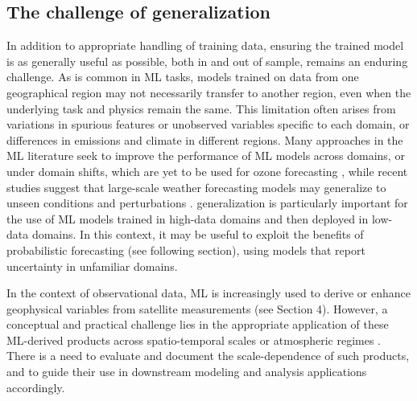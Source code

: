 \documentclass[gmd, manuscript]{copernicus}
\begin{document}

\subsection{The challenge of generalization}

In addition to appropriate handling of training data, ensuring the trained model is as generally useful as possible, both in and out of sample, remains an enduring challenge. As is common in ML tasks, models trained on data from one geographical region may not necessarily transfer to another region, even when the underlying task and physics remain the same. This limitation often arises from variations in spurious features or unobserved variables specific to each domain, or differences in emissions and climate in different regions. Many approaches in the ML literature seek to improve the performance of ML models across domains, or under domain shifts, which are yet to be used for ozone forecasting \citep{Sagawa2019}, while recent studies suggest that large-scale weather forecasting models may generalize to unseen conditions and perturbations \citep{Hakim2024}. generalization is particularly important for the use of ML models trained in high-data domains and then deployed in low-data domains. In this context, it may be useful to exploit the benefits of probabilistic forecasting (see following section), using models that report uncertainty in unfamiliar domains.

In the context of observational data, ML is increasingly used to derive or enhance geophysical variables from satellite measurements (see Section 4). However, a conceptual and practical challenge lies in the appropriate application of these ML-derived products across spatio-temporal scales \citep{di_hybrid_2017, zhu_combining_2022, tu_estimation_2023} or atmospheric regimes \citep{ghahremanloo_deep_2023}. There is a need to evaluate and document the scale-dependence of such products, and to guide their use in downstream modeling and analysis applications accordingly.
\end{document}
